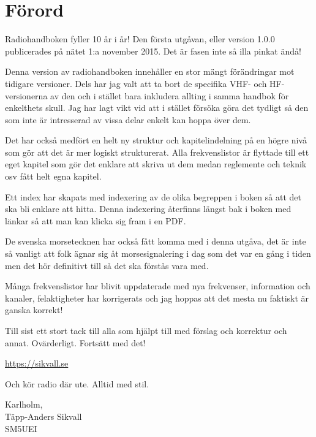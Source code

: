 
\section*{Förord}

Radiohandboken fyller 10 år i år! Den första utgåvan, eller version
1.0.0 publicerades på nätet 1:a november 2015. Det är fasen inte så
illa pinkat ändå!

Denna version av radiohandboken innehåller en stor mängt förändringar mot
tidigare versioner. Dels har jag valt att ta bort de specifika VHF- och
HF-versionerna av den och i stället bara inkludera allting i samma handbok för
enkelthets skull. Jag har lagt vikt vid att i stället försöka göra det tydligt
så den som inte är intresserad av vissa delar enkelt kan hoppa över dem.

Det har också medfört en helt ny struktur och kapitelindelning på en högre
nivå som gör att det är mer logiskt strukturerat. Alla frekvenslistor är
flyttade till ett eget kapitel som gör det enklare att skriva ut dem medan
reglemente och teknik osv fått helt egna kapitel.

Ett index har skapats med indexering av de olika begreppen i boken så att det
ska bli enklare att hitta. Denna indexering återfinns längst bak i boken med
länkar så att man kan klicka sig fram i en PDF.

De svenska morsetecknen har också fått komma med i denna utgåva, det
är inte så vanligt att folk ägnar sig åt morsesignalering i dag som
det var en gång i tiden men det hör definitivt till så det ska förstås
vara med.

Många frekvenslistor har blivit uppdaterade med nya frekvenser, information
och kanaler, felaktigheter har korrigerats och jag hoppas att det mesta nu
faktiskt är ganska korrekt!

Till sist ett stort tack till alla som hjälpt till med förslag och korrektur
och annat. Ovärderligt. Fortsätt med det!

\url{https://sikvall.se}

Och kör radio där ute. Alltid med stil.

\vspace{4mm}

\noindent Karlholm, \DokumentDatum\\
Täpp-Anders Sikvall\\
	SM5UEI

\vspace{\fill}

